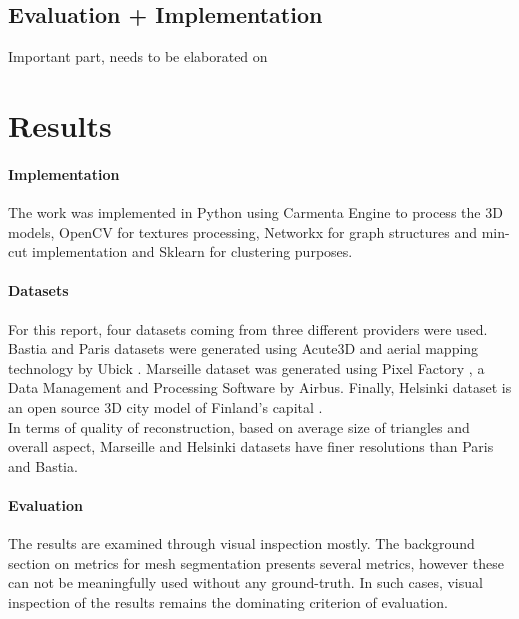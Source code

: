 \documentclass{kththesis}
\begin{document}
\section{Evaluation + Implementation }
Important part, needs to be elaborated on
\chapter{Results}
\subsubsection{Implementation}
The work was implemented in Python using Carmenta Engine to process the 3D models, OpenCV for textures processing, Networkx for graph structures and min-cut implementation and Sklearn for clustering purposes.  
\subsubsection{Datasets}
For this report, four datasets coming from three different providers were used. Bastia and Paris datasets were generated using Acute3D and aerial mapping technology by Ubick \parencite{acute3D}. Marseille dataset was generated using Pixel Factory \parencite{pixel_factory}, a Data Management and Processing Software by Airbus. Finally, Helsinki dataset is an open source 3D city model of Finland's capital \parencite{helsinki}. \\
In terms of quality of reconstruction, based on average size of triangles and overall aspect, Marseille and Helsinki datasets have finer resolutions than Paris and Bastia. 
\subsubsection{Evaluation}
The results are examined through visual inspection mostly. The background section on metrics for mesh segmentation presents several metrics, however these can not be meaningfully used without any ground-truth. In such cases, visual inspection of the results remains the dominating criterion of evaluation.  
\end{document}

